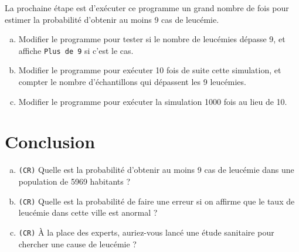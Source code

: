 \documentclass[12pt]{article}
\newcommand\CR{\texttt{(CR)}}
\begin{document}
La prochaine étape est d'exécuter ce programme un grand nombre de fois pour estimer la probabilité d'obtenir au moins 9 cas de leucémie.

\begin{enumerate}[(a)]
  \item Modifier le programme pour tester si le nombre de leucémies dépasse 9, et affiche \texttt{Plus de 9} si c'est le cas.
  \item Modifier le programme pour exécuter 10 fois de suite cette simulation, et compter le nombre d'échantillons qui dépassent les 9 leucémies.
  \item Modifier le programme pour exécuter la simulation 1000 fois au lieu de 10.
\end{enumerate}

\section{Conclusion}

\begin{enumerate}[(a)]
  \item \CR{} Quelle est la probabilité d'obtenir au moins 9 cas de leucémie dans une population de 5969 habitants ?
  \item\CR{} Quelle est la probabilité de faire une erreur si on affirme que le taux de leucémie dans cette ville est anormal ?
  \item\CR{} À la place des experts, auriez-vous lancé une étude sanitaire pour chercher une cause de leucémie ?
\end{enumerate}
\end{document}
